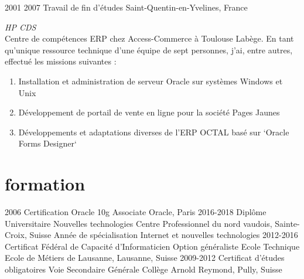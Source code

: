 \documentclass{friggeri-cv} 	%
\begin{document}
\begin{entrylist}
\entry
{2001  2007}
{Travail de fin d'études}
{Saint-Quentin-en-Yvelines, France}
{\vspace{0.2cm}\emph{HP CDS}  \\
Centre de compétences ERP chez Access-Commerce à Toulouse Labège.
En tant qu’unique ressource technique d'une équipe de sept personnes, j’ai, entre autres, effectué les
missions suivantes :
\begin{enumerate}
\item Installation et administration de serveur Oracle sur systèmes Windows et Unix
\item Développement de portail de vente en ligne pour la société Pages Jaunes
\item Développements et adaptations diverses de l’ERP OCTAL basé sur `Oracle Forms Designer`
\end{enumerate}
}
\end{entrylist}


\section{formation}

\begin{entrylist}
\entry
{2006}
{Certification Oracle {\normalfont 10g Associate}}
{Oracle, Paris}
{}
\entry
{2016-2018}
{Diplôme Universitaire {\normalfont Nouvelles technologies}}
{Centre Professionnel du nord vaudois, Sainte-Croix, Suisse}
{Année de spécialisation Internet et nouvelles technologies}
\entry
{2012-2016}
{Certificat Fédéral de Capacité d'Informaticien {\normalfont Option généraliste}}
{Ecole Technique Ecole de Métiers de Lausanne, Lausanne, Suisse}
{}
\entry
{2009-2012}
{Certificat d'études obligatoires {\normalfont Voie Secondaire Générale}}
{Collège Arnold Reymond, Pully, Suisse}
{}
\end{entrylist}
\end{document}
